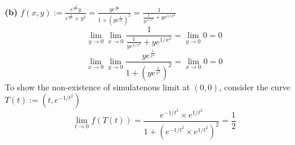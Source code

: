\documentclass[20pt,a4paper]{extarticle} %
\theoremstyle{definition}
\theoremstyle{definition}
\begin{document}
\textbf{(b)} $f(x,y):=\frac{e^{\frac{-1}{x^2}}y}{e^{\frac{-1}{x^2}}+y^2}=\frac{ye^{\frac{1}{x^2}}}
{ 1+(ye^{\frac{1}{x^2}})^2}=\frac{1}{ \frac{1}{ye^{1/x^2}}+ye^{1/x^2}} $\\
\[ \lim_{y \to 0} \lim_{x \to 0}\frac{1}{ \frac{1}{ye^{1/x^2}}+ye^{1/x^2}}= \lim_{y \to 0} 0=0  \]
\[ \lim_{x \to 0} \lim_{y \to 0}\frac{ye^{\frac{1}{x^2}}}{ 1+(ye^{\frac{1}{x^2}})^2}=\lim_{x \to 0} 0=0\]
To show the non-existence of simulatenous limit at $(0,0)$, consider the curve $T(t):=(t,e^{-1/t^2})$
\[\lim_{t\to 0}f(T(t))=\frac{e^{-1/t^2}\times e^{1/t^2}}{1+(e^{-1/t^2}\times e^{1/t^2})^2}=\frac{1}{2} \]

\newpage
\end{document}
